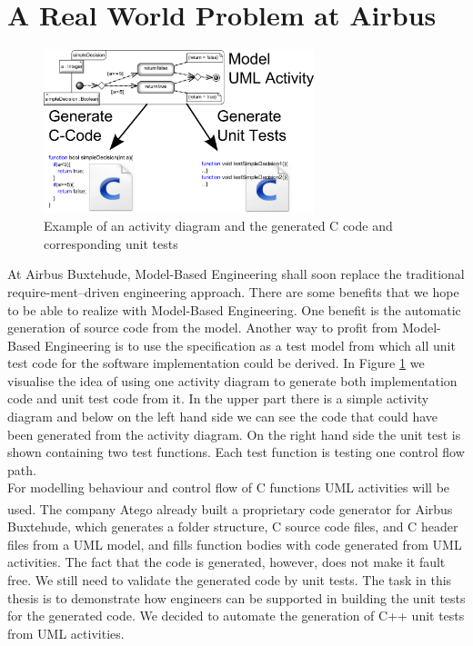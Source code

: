 \section{A Real World Problem at Airbus}
\begin{figure}
\label{fig:Act2Code+Tests}
\includegraphics[width=0.7\textwidth]{./pics/Activity2Code+Tests.png}
\caption{Example of an activity diagram and the generated C code and corresponding unit tests}
\end{figure}
At Airbus Buxtehude, Model-Based Engineering shall soon replace the traditional require-ment--driven engineering approach. There are some benefits that we hope to be able to realize with Model-Based Engineering. One benefit is the automatic generation of source code from the model. Another way to profit from Model-Based Engineering is to use the specification as a test model from which all unit test code for the software implementation could be derived. In Figure \ref{fig:Act2Code+Tests} we visualise the idea of using one activity diagram to generate both implementation code and unit test code from it. In the upper part there is a simple activity diagram and below on the left hand side we can see the code that could have been generated from the activity diagram. On the right hand side the unit test is shown containing two test functions. Each test function is testing one control flow path. \\
For modelling behaviour and control flow of C functions UML activities will be used. The company Atego\textsuperscript{\textregistered} already built a proprietary code generator for Airbus Buxtehude, which generates a folder structure, C source code files, and C header files from a UML model, and fills function bodies with code generated from UML activities. The fact that the code is generated, however, does not make it fault free. We still need to validate the generated code by unit tests. The task in this thesis is to demonstrate how engineers can be supported in building the unit tests for the generated code. We decided to automate the generation of C++ unit tests from UML activities.\\

